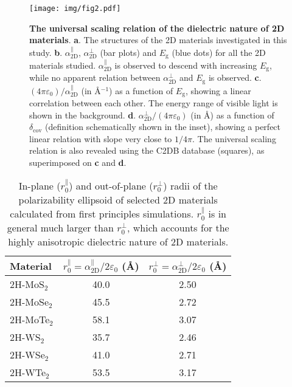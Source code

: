 \documentclass[journal=ancac3,manuscript=article,email=true,hyperref=true,keywords=false]{achemso}
\begin{document}
\begin{figure}[H]
\centering
\texttt{[image: img/fig2.pdf]}
\caption{\label{fig-3} \textbf{The universal scaling relation of the
    dielectric nature of 2D
    materials}. \textbf{a}. The structures of the 2D materials investigated in this study. \textbf{b}. $\alpha_{\mathrm{2D}}^{\parallel}$, $\alpha_{\mathrm{2D}}^{\perp}$
  (bar plots) and $E_{\mathrm{g}}$ (blue dots) for all the 2D
  materials studied.  $\alpha_{\mathrm{2D}}^{\parallel}$ is observed to descend with
  increasing $E_{\mathrm{g}}$, while no apparent relation between
  $\alpha_{\mathrm{2D}}^{\perp}$ and $E_{\mathrm{g}}$ is
  observed. \textbf{c}. $(4\pi \varepsilon_{0})/\alpha_{\mathrm{2D}}^{\parallel}$
  (in \AA{}$^{-1}$) as a function of $E_{\mathrm{g}}$, showing a linear
  correlation between each other. The energy range of visible light is
  shown in the
  background. \textbf{d}. $\alpha_{\mathrm{2D}}^{\perp}/(4\pi\varepsilon_{0})$ (in
  \AA{}) as a function of $\delta_{\mathrm{cov}}$ (definition
  schematically shown in the inset), showing a perfect linear relation
  with slope very close to $1/4\pi$. The universal scaling relation is
  also revealed using the C2DB database (squares), as superimposed on \textbf{c}
  and \textbf{d}.}
\end{figure}


\begin{table}[H]
  \centering
  \caption{In-plane ($r_{0}^{\parallel}$) and out-of-plane
    ($r_{0}^{\perp}$) radii of the polarizability ellipsoid of
    selected 2D materials calculated from first principles
    simulations. $r_{0}^{\parallel}$ is in general much larger than
    $r_{0}^{\perp}$, which accounts for the highly anisotropic
    dielectric nature of 2D materials.}
  \label{tbl:radii}  
  \begin{tabular}{lcc}
    \hline
    Material & $r_{0}^{\parallel} = \alpha_{\mathrm{2D}}^{\parallel}/2\varepsilon_{0}$ (\AA{}) &  $r_{0}^{\perp} = \alpha_{\mathrm{2D}}^{\perp}/2\varepsilon_{0}$ (\AA{})\\
    \hline
    2H-MoS$_{2}$ & 40.0 & 2.50 \\
    2H-MoSe$_{2}$ & 45.5 & 2.72  \\
    2H-MoTe$_{2}$ & 58.1 & 3.07  \\
    2H-WS$_{2}$ & 35.7 & 2.46  \\
    2H-WSe$_{2}$ & 41.0 & 2.71 \\
    2H-WTe$_{2}$ & 53.5 &  3.17\\
    \hline
  \end{tabular}
\end{table}
\end{document}
